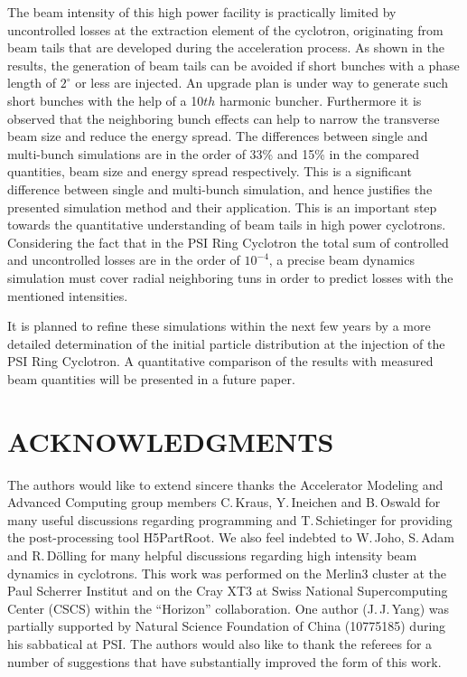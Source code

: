 \documentclass[aps,prstab,onecolumn,superscriptaddress,showpacs]{revtex4}
\begin{document}
The beam intensity of this high power facility is practically limited by uncontrolled losses at the extraction element of the cyclotron, originating from beam tails that are developed during the acceleration process.
As shown in the results, the generation of beam tails can be avoided if short bunches with a phase length of $2^\circ$  or less are injected. 
An upgrade plan is under way to generate such short bunches with the help of a 10$th$ harmonic buncher.
Furthermore it is observed that the neighboring bunch effects can help to narrow the transverse beam size and reduce the energy spread. The differences between single and multi-bunch simulations
are in the order of 33\% and 15\% in the compared quantities, beam size and energy spread respectively. This is a significant difference between single and multi-bunch simulation, and hence justifies the presented simulation method and their application.
This is an important step towards
the quantitative understanding of beam tails in high power cyclotrons. Considering the fact that in the PSI Ring Cyclotron the total sum of controlled and uncontrolled losses are
in the order of $10^{-4}$, a precise beam dynamics simulation must cover radial neighboring tuns in order to predict losses with the mentioned intensities. 

It is planned to refine these simulations within the next few years by a more detailed determination of the initial particle distribution at the injection
of the PSI Ring Cyclotron. A quantitative comparison of the results with measured beam quantities will be presented in a future paper.
\section{ACKNOWLEDGMENTS}
The authors would like to extend sincere thanks the Accelerator Modeling and Advanced Computing group members C.\,Kraus, Y.\,Ineichen and B.\,Oswald for many useful discussions regarding programming and T.\,Schietinger for providing the post-processing tool
H5PartRoot. We also feel indebted to  W.\,Joho, S.\,Adam and R.\,D\"olling for many helpful discussions regarding high
intensity beam dynamics in cyclotrons. This work was performed on the Merlin3 cluster at the Paul Scherrer Institut 
and on the Cray XT3 at Swiss National Supercomputing Center (CSCS) within the ``Horizon'' collaboration. One author (J.\,J.\,Yang) 
was partially supported by Natural Science Foundation of China (10775185) during his sabbatical at PSI.
The authors would also like to thank the referees for a number of suggestions that have substantially improved the form of this work.
\end{document}
